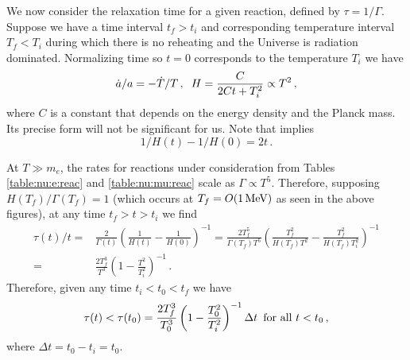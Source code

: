 We now consider the relaxation time for a given reaction, defined by $\tau=1/\Gamma$. Suppose we have a time interval $t_f>t_i$ and corresponding temperature interval $T_f<T_i$ during which there is no reheating and the Universe is radiation dominated. Normalizing time so $t=0$ corresponds to the temperature $T_i$ we have
\begin{equation}\label{ch6:Heq}
\dot a/a=-\dot T/T\,,\hspace{2mm} H=\frac{C}{2Ct+T_i^2}\propto T^2
\,,
\end{equation}
where $C$ is a constant that depends on the energy density and the Planck mass. Its precise form will not be significant for us. Note that  implies
\begin{equation}
1/H(t)-1/H(0)=2t\,.
\end{equation}

At $T\gg m_e$, the rates for reactions under consideration from Tables \ref{table:nu:e:reac} and \ref{table:nu:mu:reac} scale as $\Gamma\propto T^5$. Therefore, supposing $H(T_f)/\Gamma(T_f)=1$ (which occurs at $T_f=O(1\text{\,MeV})$ as seen in the above figures), at any time $t_f>t>t_i$ we find 
\begin{align}\label{relaxTime}
\tau(t)/t=&\frac{2}{\Gamma(t)}\left(\frac{1}{H(t)}-\frac{1}{H(0)}\right)^{-1}=\frac{2T_f^5}{\Gamma(T_f)T^5}\left(\frac{T_f^2}{H(T_f)T^2}-\frac{T_f^2}{H(T_f)T_i^2}\right)^{-1}\\
=&\frac{2T_f^3}{T^3}\left(1-\frac{T^2}{T_i^2}\right)^{-1}\,.
\end{align}
Therefore, given any time $t_i<t_0<t_f$ we have
\begin{equation}\label{ch6:tauEq}
\tau(t)<\tau(t_0)=\frac{2T_f^3}{T_0^3}\left(1-\frac{T_0^2}{T_i^2}\right)^{-1}\Delta t \text{ \,for all } t<t_0\,,
\end{equation}
where $\Delta t=t_0-t_i=t_0$.

